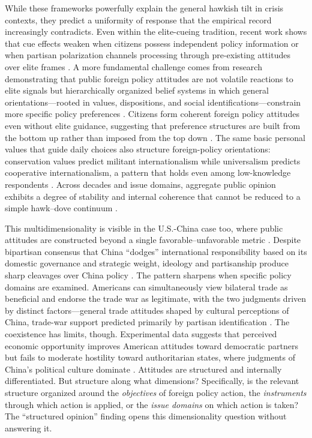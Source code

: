 \documentclass[12pt,letterpaper]{article}
\begin{document}
While these frameworks powerfully explain the general hawkish tilt in crisis contexts, they predict a uniformity of response that the empirical record increasingly contradicts. Even within the elite-cueing tradition, recent work shows that cue effects weaken when citizens possess independent policy information or when partisan polarization channels processing through pre-existing attitudes over elite frames \citep{bullock_elite_2011, guisinger_mapping_2017}. A more fundamental challenge comes from research demonstrating that public foreign policy attitudes are not volatile reactions to elite signals but hierarchically organized belief systems in which general orientations---rooted in values, dispositions, and social identifications---constrain more specific policy preferences \citep{hurwitz_how_1987}. Citizens form coherent foreign policy attitudes even without elite guidance, suggesting that preference structures are built from the bottom up rather than imposed from the top down \citep{kertzer_bottom-up_2017}. The same basic personal values that guide daily choices also structure foreign-policy orientations: conservation values predict militant internationalism while universalism predicts cooperative internationalism, a pattern that holds even among low-knowledge respondents \citep{rathbun_taking_2016}. Across decades and issue domains, aggregate public opinion exhibits a degree of stability and internal coherence that cannot be reduced to a simple hawk--dove continuum \citep{page_rational_1992, kertzer_public_2023}. 

This multidimensionality is visible in the U.S.-China case too, where public attitudes are constructed beyond a single favorable--unfavorable metric \citep{li_more_2021}. Despite bipartisan consensus that China ``dodges'' international responsibility based on its domestic governance and strategic weight, ideology and partisanship produce sharp cleavages over China policy \citep{gries_political_2010, gries_red_2014, li_how_2015}. The pattern sharpens when specific policy domains are examined. Americans can simultaneously view bilateral trade as beneficial and endorse the trade war as legitimate, with the two judgments driven by distinct factors---general trade attitudes shaped by cultural perceptions of China, trade-war support predicted primarily by partisan identification \citep{jin_americans_2021}. The coexistence has limits, though. Experimental data suggests that perceived economic opportunity improves American attitudes toward democratic partners but fails to moderate hostility toward authoritarian states, where judgments of China's political culture dominate \citep{wick_capabilities_2014}. Attitudes are structured and internally differentiated. But structure along what dimensions? Specifically, is the relevant structure organized around the \emph{objectives} of foreign policy action, the \emph{instruments} through which action is applied, or the \emph{issue domains} on which action is taken? The ``structured opinion'' finding opens this dimensionality question without answering it.
\end{document}
